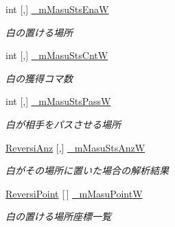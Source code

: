 \begin{DoxyCompactItemize}
int \mbox{[},\mbox{]} \hyperlink{class_reversi_wpf_1_1_my_reversi_a829c8b2bddf2ef75c00694df7279d719}{\+\_\+m\+Masu\+Sts\+EnaW}
\begin{DoxyCompactList}\small\item\em 白の置ける場所 \end{DoxyCompactList}\item 
\mbox{\label{class_reversi_wpf_1_1_my_reversi_a7b061b449d33913ff3a5c1070853e362}} 
int \mbox{[},\mbox{]} \hyperlink{class_reversi_wpf_1_1_my_reversi_a7b061b449d33913ff3a5c1070853e362}{\+\_\+m\+Masu\+Sts\+CntW}
\begin{DoxyCompactList}\small\item\em 白の獲得コマ数 \end{DoxyCompactList}\item 
\mbox{\label{class_reversi_wpf_1_1_my_reversi_a96b0453ea035082c59361e3f6accfe2b}} 
int \mbox{[},\mbox{]} \hyperlink{class_reversi_wpf_1_1_my_reversi_a96b0453ea035082c59361e3f6accfe2b}{\+\_\+m\+Masu\+Sts\+PassW}
\begin{DoxyCompactList}\small\item\em 白が相手をパスさせる場所 \end{DoxyCompactList}\item 
\mbox{\label{class_reversi_wpf_1_1_my_reversi_ada90dae4eb587e21a96b89fb8df21a83}} 
\hyperlink{class_reversi_wpf_1_1_reversi_anz}{Reversi\+Anz} \mbox{[},\mbox{]} \hyperlink{class_reversi_wpf_1_1_my_reversi_ada90dae4eb587e21a96b89fb8df21a83}{\+\_\+m\+Masu\+Sts\+AnzW}
\begin{DoxyCompactList}\small\item\em 白がその場所に置いた場合の解析結果 \end{DoxyCompactList}\item 
\mbox{\label{class_reversi_wpf_1_1_my_reversi_a6d7ee497538c97b0d11b09e4f0530303}} 
\hyperlink{class_reversi_wpf_1_1_reversi_point}{Reversi\+Point} \mbox{[}$\,$\mbox{]} \hyperlink{class_reversi_wpf_1_1_my_reversi_a6d7ee497538c97b0d11b09e4f0530303}{\+\_\+m\+Masu\+PointW}
\begin{DoxyCompactList}\small\item\em 白の置ける場所座標一覧 \end{DoxyCompactList}\item 

\end{DoxyCompactItemize}
